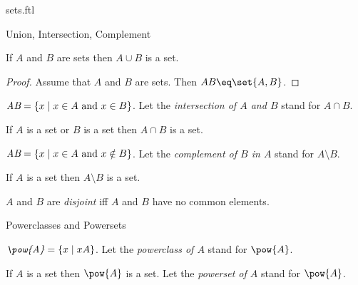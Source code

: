 \documentclass{naproche-library}
\begin{document}
\begin{smodule}[title=Classes and Sets]{sets.ftl}
\begin{sfragment}{Union, Intersection, Complement}
  \begin{forthel}
    \begin{proposition*}[id=UnionProp]
      If $A$ and $B$ are sets then $A\cup B$ is a set.
    \end{proposition*}
    \begin{proof}
      Assume that $A$ and $B$ are sets.
      Then $A\cup B\eq \bigcup\set{A,B}$.
    \end{proof}
  \end{forthel}

  \begin{definition*}[forthel,id=IntersectionDef]
    $\emph{A\cap B}=\{x\mid x\in A\text{ and }x\in B\}$.
    Let the \emph{intersection of $A$ and $B$} stand for $A\cap B$.
  \end{definition*}

  \begin{proposition*}[forthel,id=IntersectionProp]
    If $A$ is a set or $B$ is a set then $A\cap B$ is a set.
  \end{proposition*}

  \begin{definition*}[forthel,id=ComplementDef]
    $\emph{A\setminus B}=\{x\mid x\in A\text{ and }x\notin B\}$.
    Let the \emph{complement of $B$ in $A$} stand for $A\setminus B$.
  \end{definition*}

  \begin{proposition*}[forthel,id=ComplementProp]
    If $A$ is a set then $A\setminus B$ is a set.
  \end{proposition*}

  \begin{definition*}[forthel,id=DisjointDef]
    $A$ and $B$ are \emph{disjoint} iff $A$ and $B$ have no common elements.
  \end{definition*}
\end{sfragment}

\begin{sfragment}{Powerclasses and Powersets}
  \begin{definition*}[forthel,id=PowerclassDef]
    $\emph{\pow{A}}=\{x\mid x\subseteq A\}$.
    Let the \emph{powerclass of $A$} stand for $\pow{A}$.
  \end{definition*}

  \begin{axiom*}[forthel,title=Powerset Axiom,id=PowersetAx]
    If $A$ is a set then $\pow{A}$ is a set.
    Let the \emph{powerset of $A$} stand for $\pow{A}$.
  \end{axiom*}
\end{sfragment}


\end{smodule}
\end{document}
